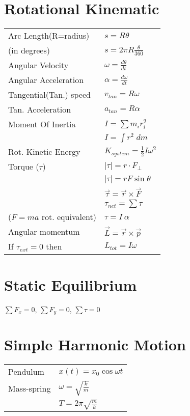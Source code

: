 \documentclass[5pt]{article}
\begin{document}
\begin{multicols}{3}
\section{Rotational Kinematic}
\begin{tabular}{ll}
Arc Length\footnotesize{(R=radius)} & $s=R\theta$\\
(\footnotesize{in degrees}) & $s=2\pi R \frac{\theta}{360}$\\
Angular Velocity  & $\omega=\frac{d\theta}{dt}$\\
Angular Acceleration  & $\alpha=\frac{d\omega}{dt}$\\
Tangential(Tan.) speed & $v_{tan}=R\omega$\\
Tan. Acceleration & $a_{tan}=R\alpha$\\
Moment Of Inertia & $I=\sum{m_ir_i^2}$\\
 & $I=\int{r^2\; dm}$\\
Rot. Kinetic Energy & $K_{system}=\frac{1}{2}I\omega^2$\\
Torque ($\tau$) & $|\tau|=r\cdot F_\perp$\\
 & $|\tau|=rF\sin{\theta}$\\ 
 & $\vec{\tau}=\Vec{r}\times\Vec{F}$\\ 
& $\tau_{net}=\sum\tau$\\
\footnotesize{($F=ma$ rot. equivalent)} & $\tau=I\:\alpha$\\
Angular momentum & $\vec{L}=\vec{r}\times\Vec{p}$\\
\footnotesize{ If $\tau_{ext}=0$ then} & $L_{tot}=I\omega$\\
\end{tabular}


\section{Static Equilibrium}
$\sum F_x=0$, $\sum F_y=0$, $\sum\tau=0$


\section{Simple Harmonic Motion}
\begin{tabular}{ll}
Pendulum & $x(t)=x_0\cos{\omega t}$\\
Mass-spring & $\omega=\sqrt{\frac{k}{m}}$\\
 & $T=2\pi\sqrt{\frac{m}{k}}$\\
\end{tabular}



\end{multicols}
\end{document}
